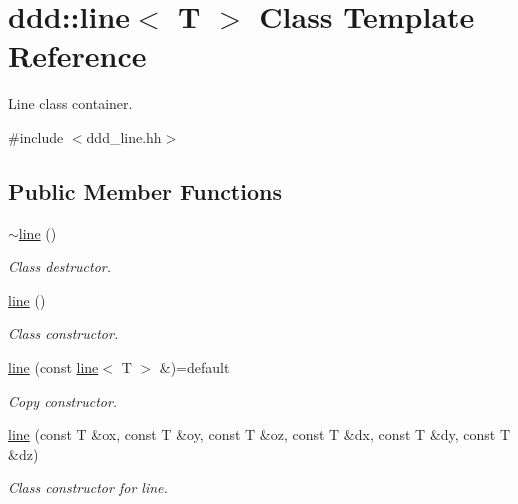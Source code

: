 \hypertarget{classddd_1_1line}{}\section{ddd\+:\+:line$<$ T $>$ Class Template Reference}
\label{classddd_1_1line}


Line class container.  




{\ttfamily \#include $<$ddd\+\_\+line.\+hh$>$}

\subsection*{Public Member Functions}
\begin{DoxyCompactItemize}
\item 
\mbox{\label{classddd_1_1line_a456f8a87d73fbc2aaf27c502bec653e3}} 
\hyperlink{classddd_1_1line_a456f8a87d73fbc2aaf27c502bec653e3}{$\sim$line} ()
\begin{DoxyCompactList}\small\item\em Class destructor. \end{DoxyCompactList}\item 
\mbox{\label{classddd_1_1line_a1bfe7d77aec2a695f68edd6c94224ecc}} 
\hyperlink{classddd_1_1line_a1bfe7d77aec2a695f68edd6c94224ecc}{line} ()
\begin{DoxyCompactList}\small\item\em Class constructor. \end{DoxyCompactList}\item 
\mbox{\label{classddd_1_1line_a0a87f672568157869bbf2aa6c4f78395}} 
\hyperlink{classddd_1_1line_a0a87f672568157869bbf2aa6c4f78395}{line} (const \hyperlink{classddd_1_1line}{line}$<$ T $>$ \&)=default
\begin{DoxyCompactList}\small\item\em Copy constructor. \end{DoxyCompactList}\item 
\mbox{\label{classddd_1_1line_ae98a2882b4367e03d6d812f2b5fb31bd}} 
\hyperlink{classddd_1_1line_ae98a2882b4367e03d6d812f2b5fb31bd}{line} (const T \&ox, const T \&oy, const T \&oz, const T \&dx, const T \&dy, const T \&dz)
\begin{DoxyCompactList}\small\item\em Class constructor for line. \end{DoxyCompactList}\item 

\end{DoxyCompactItemize}
